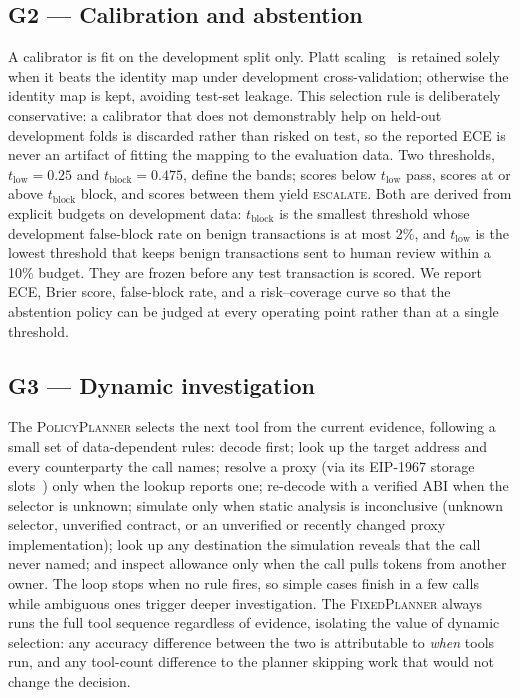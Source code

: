 \documentclass[conference]{IEEEtran}
\begin{document}
\subsection{G2 --- Calibration and abstention}
A calibrator is fit on the development split only. Platt
scaling~\cite{niculescu2005predicting} is retained solely when it beats the identity
map under development cross-validation; otherwise the identity map is kept, avoiding
test-set leakage. This selection rule is deliberately conservative: a calibrator that
does not demonstrably help on held-out development folds is discarded rather than
risked on test, so the reported ECE is never an artifact of fitting the mapping to the
evaluation data. Two thresholds, $t_{\text{low}}=0.25$ and $t_{\text{block}}=0.475$,
define the bands; scores below $t_{\text{low}}$ pass, scores at or above
$t_{\text{block}}$ block, and scores between them yield \textsc{escalate}. Both are
derived from explicit budgets on development data: $t_{\text{block}}$ is the smallest
threshold whose development false-block rate on benign transactions is at most 2\%,
and $t_{\text{low}}$ is the lowest threshold that keeps benign transactions sent to
human review within a 10\% budget. They are frozen before any test transaction is
scored. We report ECE, Brier score, false-block rate,
and a risk--coverage curve so that the abstention policy can be judged at every
operating point rather than at a single threshold.

\subsection{G3 --- Dynamic investigation}
The \textsc{PolicyPlanner} selects the next tool from the current evidence, following a
small set of data-dependent rules: decode first; look up the target address and every
counterparty the call names; resolve a proxy (via its EIP-1967 storage
slots~\cite{eip1967}) only when the lookup reports one; re-decode with a verified ABI
when the selector is unknown; simulate only when static analysis is inconclusive
(unknown selector, unverified contract, or an unverified or recently changed proxy
implementation); look up any destination the simulation reveals that the call never
named; and inspect allowance only when the call pulls tokens from another owner. The
loop stops when no rule fires, so simple cases finish in a few calls while ambiguous
ones trigger deeper investigation. The \textsc{FixedPlanner} always runs the
full tool sequence regardless of evidence, isolating the value of dynamic selection:
any accuracy difference between the two is attributable to \emph{when} tools run, and
any tool-count difference to the planner skipping work that would not change the
decision.
\end{document}
